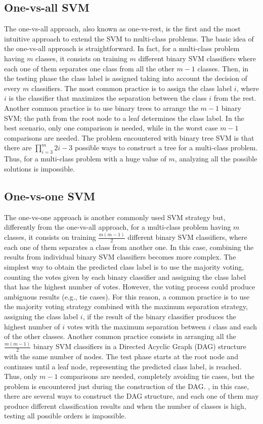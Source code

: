 \subsection{One-vs-all SVM} 
The one-vs-all approach, also known as one-vs-rest, is the first and the most intuitive approach to extend the SVM to multi-class problems. The basic idea of the one-vs-all approach is straightforward. In fact, for a multi-class problem having $m$ classes, it consists on training $m$ different binary SVM classifiers where each one of them separates one class from all the other $m-1$ classes. Then, in the testing phase the class label is assigned taking into account the decision of every $m$ classifiers. The most common practice is to assign the class label $i$, where $i$ is the classifier that maximizes the separation between the class $i$ from the rest. Another common practice is to use binary trees to arrange the $m-1$ binary SVM; the path from the root node to a leaf determines the class label. In the best scenario, only one comparison is needed, while in the worst case  $m-1$ comparisons are needed. The problem encountered with binary tree SVM is that there are $\prod_{i=3}^{m}2i-3$ possible ways to construct a tree for a multi-class problem. Thus, for a multi-class problem with a huge value of $m$, analyzing all the possible solutions is impossible.

\subsection{One-vs-one SVM}
The one-vs-one approach is another commonly used SVM strategy but, differently from the one-vs-all approach, for a multi-class problem having $m$ classes, it consists on training $\frac{m(m-1)}{2}$ different binary SVM classifiers, where each one of them separates a class from another one. In this case, combining the results from individual binary SVM classifiers becomes more complex. The simplest way to obtain the predicted class label is to use the majority voting, counting the votes given by each binary classifier and assigning the class label that has the highest number of votes. However, the voting process could produce ambiguous results (e.g., tie cases).
For this reason, a common practice is to use the majority voting strategy combined with the maximum separation strategy, assigning the class label $i$, if the result of the binary classifier produces the highest number of $i$ votes with the maximum separation between $i$ class and each of the other classes. Another common practice consists in arranging all the $\frac{m(m-1)}{2}$ binary SVM classifiers in a Directed Acyclic Graph (\acs{DAG}) structure with the same number of nodes. The test phase starts at the root node and continues until a leaf node, representing the predicted class label, is reached. Thus, only $m-1$ comparisons are needed, completely avoiding tie cases, but the problem is encountered just during the construction of the DAG. , in this case, there are several ways to construct the DAG structure, and each one of them may produce different classification results and when the number of classes is high, testing all possible orders is impossible.


